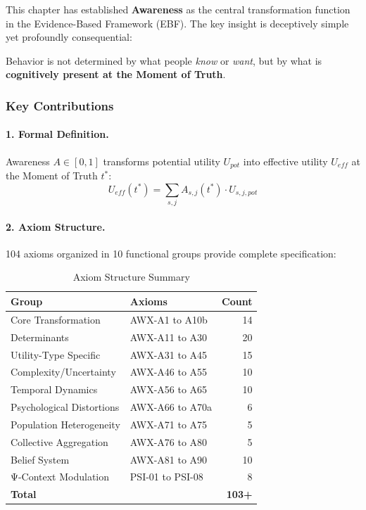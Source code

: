 
This chapter has established \textbf{Awareness} as the central transformation 
function in the Evidence-Based Framework (EBF). The key insight is deceptively 
simple yet profoundly consequential:

\begin{insight}
Behavior is not determined by what people \emph{know} or \emph{want}, 
but by what is \textbf{cognitively present at the Moment of Truth}.
\end{insight}

\subsubsection{Key Contributions}

\paragraph{1. Formal Definition.}
Awareness $A \in [0,1]$ transforms potential utility $U_{pot}$ into 
effective utility $U_{eff}$ at the Moment of Truth $t^*$:
\begin{equation}
U_{eff}(t^*) = \sum_{s,j} A_{s,j}(t^*) \cdot U_{s,j,pot}
\end{equation}

\paragraph{2. Axiom Structure.}
104 axioms organized in 10 functional groups provide complete specification:

\begin{table}[htbp]
\centering
\caption{Axiom Structure Summary}
\label{tab:axiom-summary-final}
\begin{tabular}{@{}llr@{}}
\toprule
\textbf{Group} & \textbf{Axioms} & \textbf{Count} \\
\midrule
Core Transformation & AWX-A1 to A10b & 14 \\
Determinants & AWX-A11 to A30 & 20 \\
Utility-Type Specific & AWX-A31 to A45 & 15 \\
Complexity/Uncertainty & AWX-A46 to A55 & 10 \\
Temporal Dynamics & AWX-A56 to A65 & 10 \\
Psychological Distortions & AWX-A66 to A70a & 6 \\
Population Heterogeneity & AWX-A71 to A75 & 5 \\
Collective Aggregation & AWX-A76 to A80 & 5 \\
Belief System & AWX-A81 to A90 & 10 \\
Ψ-Context Modulation & PSI-01 to PSI-08 & 8 \\
\midrule
\textbf{Total} & & \textbf{103+} \\
\bottomrule
\end{tabular}
\end{table}

